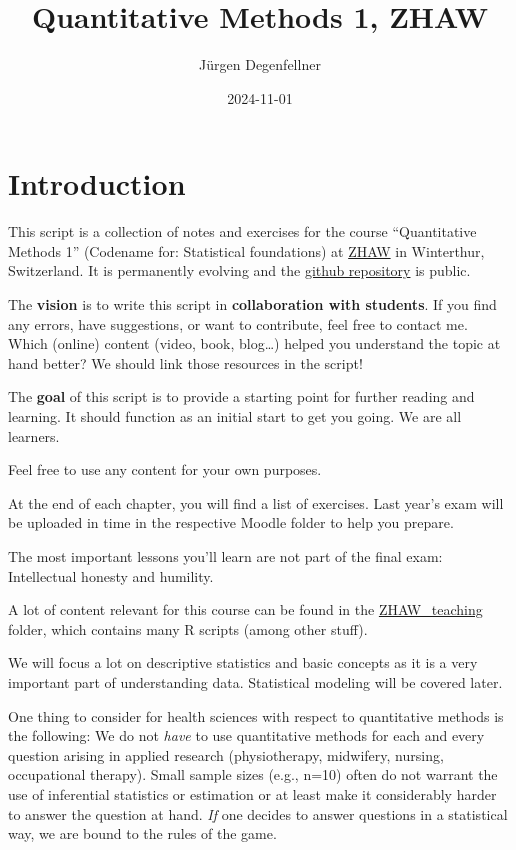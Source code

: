 \documentclass[
]{book}
\title{Quantitative Methods 1, ZHAW}
\author{Jürgen Degenfellner}
\date{2024-11-01}
\begin{document}
\maketitle

{
\setcounter{tocdepth}{1}
\tableofcontents
}
\chapter{Introduction}\label{introduction}

This script is a collection of notes and exercises for the course ``Quantitative Methods 1'' (Codename for: Statistical foundations) at \href{https://www.zhaw.ch/en/university/}{ZHAW} in Winterthur, Switzerland.
It is permanently evolving and the \href{https://github.com/jdegenfellner/Script_QM1_ZHAW}{github repository} is public.

The \textbf{vision} is to write this script in \textbf{collaboration with students}. If you find any errors, have suggestions, or want to contribute, feel free to contact me.
Which (online) content (video, book, blog\ldots) helped you understand the topic at hand better? We should link those resources in the script!

The \textbf{goal} of this script is to provide a starting point for further reading and learning. It should function as an initial start to get you going. We are all learners.

Feel free to use any content for your own purposes.

At the end of each chapter, you will find a list of exercises. Last year's exam will be uploaded in time in the respective Moodle folder to help you prepare.

The most important lessons you'll learn are not part of the final exam: Intellectual honesty and humility.

A lot of content relevant for this course can be found in the \href{https://github.com/jdegenfellner/ZHAW_Teaching}{ZHAW\_teaching} folder,
which contains many R scripts (among other stuff).

We will focus a lot on descriptive statistics and basic concepts as it is a very important part of understanding data.
Statistical modeling will be covered later.

One thing to consider for health sciences with respect to quantitative methods is the following: We do not \emph{have} to use quantitative methods for each and every
question arising in applied research (physiotherapy, midwifery, nursing, occupational therapy). Small sample sizes (e.g., n=10) often do not warrant the use of inferential
statistics or estimation or at least make it considerably harder to answer the question at hand.
\emph{If} one decides to answer questions in a statistical way, we are bound to the rules of the game.
\end{document}
